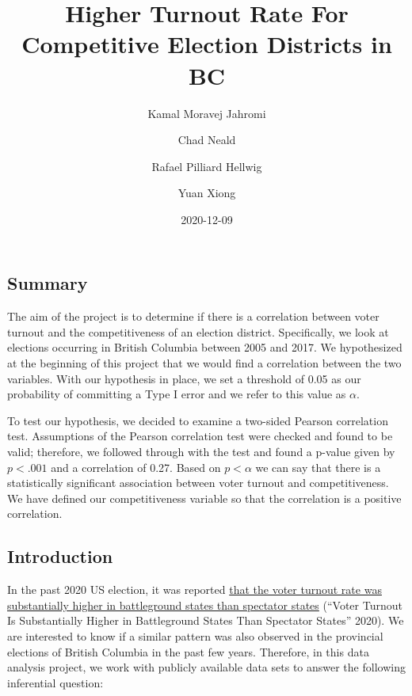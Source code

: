 \documentclass[
]{article}
\title{Higher Turnout Rate For Competitive Election Districts in BC}
\author{Kamal Moravej Jahromi \and Chad Neald \and Rafael Pilliard
Hellwig \and Yuan Xiong}
\date{2020-12-09}
\begin{document}
\maketitle

{
\setcounter{tocdepth}{2}
\tableofcontents
}
\captionsetup[table]{labelformat=empty}
\captionsetup[figure]{labelformat=empty}

\hypertarget{summary}{%
\subsection{Summary}\label{summary}}

The aim of the project is to determine if there is a correlation between
voter turnout and the competitiveness of an election district.
Specifically, we look at elections occurring in British Columbia between
2005 and 2017. We hypothesized at the beginning of this project that we
would find a correlation between the two variables. With our hypothesis
in place, we set a threshold of 0.05 as our probability of committing a
Type I error and we refer to this value as \(\alpha\).

To test our hypothesis, we decided to examine a two-sided Pearson
correlation test. Assumptions of the Pearson correlation test were
checked and found to be valid; therefore, we followed through with the
test and found a p-value given by \(p < .001\) and a correlation of
0.27. Based on \(p < \alpha\) we can say that there is a statistically
significant association between voter turnout and competitiveness. We
have defined our competitiveness variable so that the correlation is a
positive correlation.

\hypertarget{introduction}{%
\subsection{Introduction}\label{introduction}}

In the past 2020 US election, it was reported
\href{https://www.nationalpopularvote.com/voter-turnout-substantially-higher-battleground-states-spectator-states}{that
the voter turnout rate was substantially higher in battleground states
than spectator states} ({``Voter Turnout Is Substantially Higher in
Battleground States Than Spectator States''} 2020). We are interested to
know if a similar pattern was also observed in the provincial elections
of British Columbia in the past few years. Therefore, in this data
analysis project, we work with publicly available data sets to answer
the following inferential question:
\end{document}
